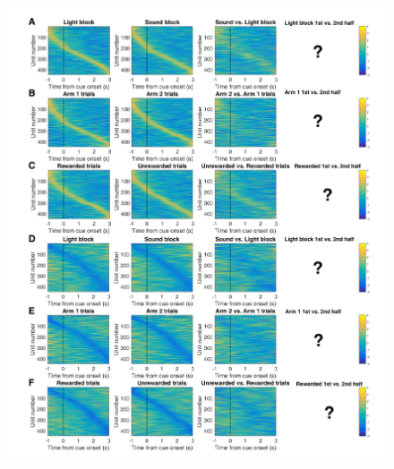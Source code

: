 \documentclass[11pt]{article}
\begin{document}
\begin{figure}[h]
\centering
\includegraphics[height=0.7\textheight]{Fig 8 - Task tiling.png}

\end{figure}
\end{document}
